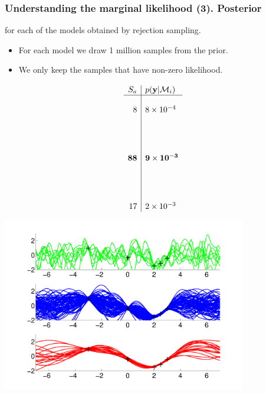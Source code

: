\begin{frame}
\frametitle{Understanding the marginal likelihood (3). Posterior}

 for each of the models obtained by rejection sampling.
\begin{itemize}
\item For each model we draw 1 million samples from the prior.
\item We only keep the samples that have non-zero likelihood.
\end{itemize}
\vspace{-0.5cm}
\parbox{0.18\textwidth}
{
%
\vspace{-0.6cm}
\[
\begin{array}{r|l}
S_a & p(\mathbf y|\mathcal{M}_i)\\
\hline\\
8 & 8 \times 10^{-4}\\[1.65cm]
\mathbf{88} & \mathbf{9 \times 10^{-3}}\\[1.65cm]
17 & 2\times 10^{-3}
\end{array}
\]
%
}
\parbox{0.81\textwidth}
{
\centerline{\includegraphics[width=0.8\textwidth]{rejection_sampling_data_posteriors.pdf}}
}


\end{frame}
